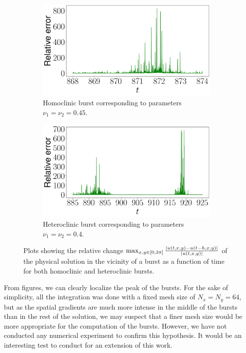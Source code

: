 \documentclass[twoside]{article}
\begin{document}
\begin{figure}[ht]
  \centering
  \begin{subfigure}[ht]{0.42\textwidth}
    \includegraphics[width=\textwidth]{images/burst_nu1=0.45_nu2=0.45.pdf}
    \caption{Homoclinic burst corresponding to parameters $\nu_1=\nu_2=0.45$.}
  \end{subfigure}\hspace{0.053333\textwidth}
  \begin{subfigure}[ht]{0.42\textwidth}
    \includegraphics[width=\textwidth]{images/burst_nu1=0.40_nu2=0.40.pdf}
    \caption{Heteroclinic burst corresponding to parameters $\nu_1=\nu_2=0.4$.}
  \end{subfigure}
  \caption{Plots showing the relative change $\max_{x,y\in [0,2\pi]} \frac{\abs{u(t,x,y)-u(t-h,x,y)}}{\abs{u(t,x,y)}}$ of the physical solution in the vicinity of a burst as a function of time for both homoclinic and heteroclinic bursts.}
  \label{fig:burst_relative}
\end{figure}

From figures, we can clearly localize the peak of the bursts.  For the sake of simplicity, all the integration was done with a fixed mesh size of $N_x=N_y=64$, but as the spatial gradients are much more intense in the middle of the bursts than in the rest of the solution, we may suspect that a finer mesh size would be more appropriate for the computation of the bursts. However, we have not conducted any numerical experiment to confirm this hypothesis. It would be an interesting test to conduct for an extension of this work.
\end{document}
